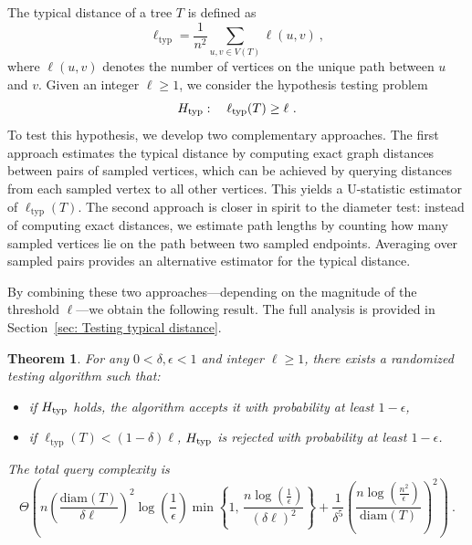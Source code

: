 \documentclass[12pt]{article}
\newtheorem{theorem}{Theorem}[section]
\newcommand{\diam}[1]{\mathrm{diam}\!\left(#1\right)}
\begin{document}
The typical distance of a tree $T$ is defined as
\[
\ell_{\mathrm{typ}} = \frac{1}{n^2}\sum_{u,v\in V(T)} \ell(u,v)~,
\]
where $\ell(u,v)$ denotes the number of vertices on the unique path between $u$ and $v$. Given an integer $\ell \ge 1$, we consider the hypothesis testing problem
\[
H_{\rm typ}: \quad \ell_{\mathrm{typ}}(T) \ge \ell~.
\]
To test this hypothesis, we develop two complementary approaches.
The first approach estimates the typical distance by computing exact graph distances between pairs of sampled vertices, which can be achieved by querying distances from each sampled vertex to all other vertices.
This yields a U-statistic estimator of $\ell_{\mathrm{typ}}(T)$.
The second approach is closer in spirit to the diameter test: instead of computing exact distances, we estimate path lengths by counting how many sampled vertices lie on the path between two sampled endpoints.
Averaging over sampled pairs provides an alternative estimator for the typical distance.

By combining these two approaches—depending on the magnitude of the threshold $\ell$—we obtain the following result.
The full analysis is provided in Section~\ref{sec: Testing typical distance}.

\begin{theorem}\label{thm: typ dist}
For any $0<\delta,\epsilon<1$ and integer $\ell \ge 1$, there exists a randomized testing algorithm such that:
\begin{itemize}
    \item [(i)] if $H_{\rm typ}$ holds, the algorithm accepts it with probability at least $1-\epsilon$,
    \item [(ii)] if $\ell_{\mathrm{typ}}(T) < (1-\delta)\ell$, $H_{\rm typ}$ is rejected with probability at least $1-\epsilon$.
\end{itemize}
The total query complexity is
\[
\Theta\left(
n\left(\frac{\diam{T}}{\delta\ell}\right)^2
\log\!\left(\frac{1}{\epsilon}\right)
\min\left\{
1,\,
\frac{n\log(\frac{1}{\epsilon})}{(\delta \ell)^2}
\right\}
+
\frac{1}{\delta^5}
\left(
\frac{n\log(\frac{n^2}{\epsilon})}{\diam{T}}
\right)^2
\right)~.
\]
\end{theorem}
\end{document}
